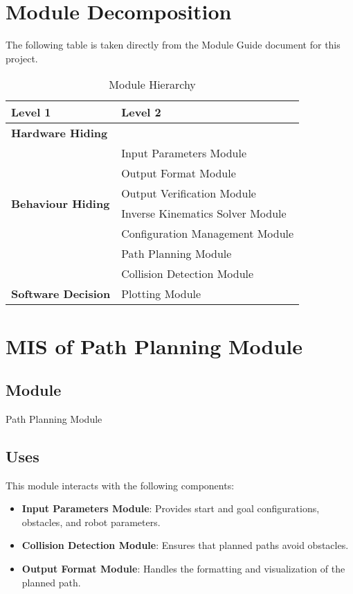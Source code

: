 \documentclass[12pt, titlepage]{article}
\begin{document}
\section{Module Decomposition}

The following table is taken directly from the Module Guide document for this project.


\begin{table}[h!]
  \centering
  \begin{tabular}{p{} p{}}
  \toprule
  \textbf{Level 1} & \textbf{Level 2}\\
  \midrule
  \textbf{Hardware Hiding} & \\ 
  \midrule
  \multirow{6}{0.3\textwidth}{\textbf{Behaviour Hiding}} 
  & Input Parameters Module \\ 
  & Output Format Module \\ 
  & Output Verification Module \\ 
  & Inverse Kinematics Solver Module \\ 
  & Configuration Management Module \\ 
  & Path Planning Module \\ 
  & Collision Detection Module \\ 
  \midrule
  \multirow{1}{0.3\textwidth}{\textbf{Software Decision}} 
  & Plotting Module \\ 
  \bottomrule
  \end{tabular}
  \caption{Module Hierarchy}
  \label{TblMH}
\end{table}


\newpage

\section{MIS of Path Planning Module} \label{Module:PathPlanning}

\subsection{Module}
Path Planning Module

\subsection{Uses}
This module interacts with the following components:
\begin{itemize}
\item \textbf{Input Parameters Module}: Provides start and goal configurations, obstacles, and robot parameters.
\item \textbf{Collision Detection Module}: Ensures that planned paths avoid obstacles.
\item \textbf{Output Format Module}: Handles the formatting and visualization of the planned path.
\end{itemize}
\end{document}
